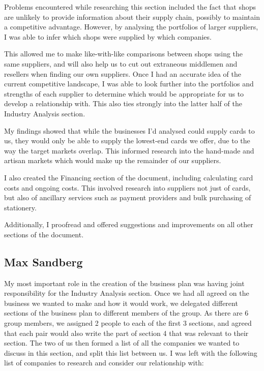 \documentclass[10pt,a4paper]{article}
\begin{document}
\begin{appendices}
Problems encountered while researching this section included the fact that shops are unlikely to provide information about their supply chain, possibly to maintain a competitive advantage. However, by analysing the portfolios of larger suppliers, I was able to infer which shops were supplied by which companies.

This allowed me to make like-with-like comparisons between shops using the same suppliers, and will also help us to cut out extraneous middlemen and resellers when finding our own suppliers. Once I had an accurate idea of the current competitive landscape, I was able to look further into the portfolios and strengths of each supplier to determine which would be appropriate for us to develop a relationship with. This also ties strongly into the latter half of the Industry Analysis section.

My findings showed that while the businesses I'd analysed could supply cards to us, they would only be able to supply the lowest-end cards we offer, due to the way the target markets overlap. This informed research into the hand-made and artisan markets which would make up the remainder of our suppliers.

I also created the Financing section of the document, including calculating card costs and ongoing costs. This involved research into suppliers not just of cards, but also of ancillary services such as payment providers and bulk purchasing of stationery.

Additionally, I proofread and offered suggestions and improvements on all other sections of the document.

\clearpage
\subsection{Max Sandberg}\label{subsec:maxSandberg}
My most important role in the creation of the business plan was having joint responsibility for the Industry Analysis section. Once we had all agreed on the business we wanted to make and how it would work, we delegated different sections of the business plan to different members of the group. As there are 6 group members, we assigned 2 people to each of the first 3 sections, and agreed that each pair would also write the part of section 4 that was relevant to their section. The two of us then formed a list of all the companies we wanted to discuss in this section, and split this list between us. I was left with the following list of companies to research and consider our relationship with:


\end{appendices}
\end{document}
